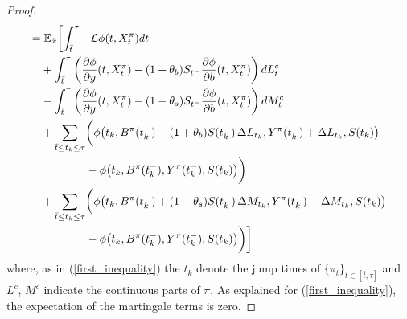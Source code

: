 \begin{proof}
\begin{align}
    = & \; \mathbb{E}_{\bar x} \biggl[ \int_{\bar t}^{\tau} -\mathcal{L} \phi(t,X^{\pi}_t) dt \\ \nonumber
    & + \int_{\bar t}^{\tau} \left(\frac{\partial \phi}{\partial y}(t, X^{\pi}_t) -(1+\theta_b) S_{t^-} \frac{\partial \phi}{\partial b}( t, X^{\pi}_t)\right) dL^c_t \\ \nonumber
    & - \int_{\bar t}^{\tau} \left(\frac{\partial \phi}{\partial y}( t, X^{\pi}_t)-(1-\theta_s) S_{t^-} \frac{\partial \phi}{\partial b}( t, X^{\pi}_t)\right) dM^c_t \\ \nonumber
    & + \sum_{\bar t \leq t_k \leq \tau} \biggl( \phi \bigl( t_k, B^{\pi}(t_k^-) - (1+\theta_b) S(t_k^-)\, \Delta L_{t_k}, Y^{\pi}(t_k^-) + \Delta L_{t_k}, S(t_k) \bigr) \\ \nonumber 
    & \hspace{4em} - \phi \bigl(t_k, B^{\pi}(t_k^-), Y^{\pi}(t_k^-), S(t_k) \bigr) \biggr) \\ \nonumber
    & + \sum_{\bar t \leq t_k \leq \tau} \biggl( \phi \bigl( t_k, B^{\pi}(t_k^-) + (1-\theta_s) S(t_k^-)\, \Delta M_{t_k}, Y^{\pi}(t_k^-) - \Delta M_{t_k}, S(t_k) \bigr) \\
    & \hspace{4em} - \phi \bigl(t_k, B^{\pi}(t_k^-), Y^{\pi}(t_k^-), S(t_k) \bigr) \biggr) \biggr] 
\end{align}
where, as in (\ref{first_inequality}) the $t_k$ denote the jump times of $\{\pi_t\}_{t \in [\bar t, \tau]}$ and $L^c$, $M^c$ indicate the continuous parts of $\pi$. 
As explained for (\ref{first_inequality}), the expectation of the martingale terms is zero.


\end{proof}

